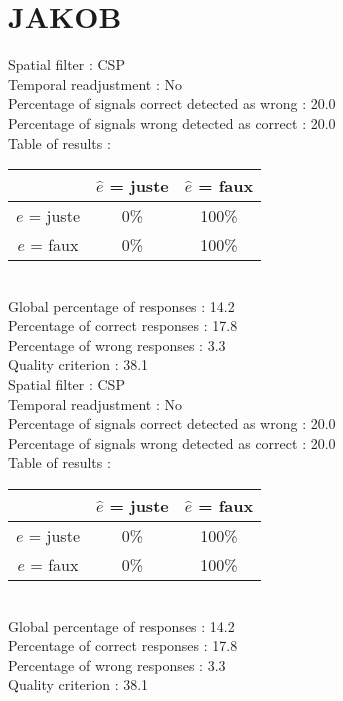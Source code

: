 \section*{JAKOB}
Spatial filter : CSP \\
Temporal readjustment : No \\
Percentage of signals correct detected as wrong :   20.0 \\
Percentage of signals wrong detected as correct :   20.0 \\
Table of results : \\
\begin{tabular}{|c|c|c|}
\hline				& $\hat{e}$ = juste & $\hat{e}$ = faux \\
\hline  $e$ = juste	&      0\%			&    100\%		\\
\hline  $e$ = faux	&      0\%			&    100\%		\\
\hline
\end{tabular}\\
Global percentage of responses :   14.2 \\
Percentage of correct responses :   17.8 \\
Percentage of wrong responses :    3.3 \\
Quality criterion :   38.1 \\

Spatial filter : CSP \\
Temporal readjustment : No \\
Percentage of signals correct detected as wrong :   20.0 \\
Percentage of signals wrong detected as correct :   20.0 \\
Table of results : \\
\begin{tabular}{|c|c|c|}
\hline				& $\hat{e}$ = juste & $\hat{e}$ = faux \\
\hline  $e$ = juste	&      0\%			&    100\%		\\
\hline  $e$ = faux	&      0\%			&    100\%		\\
\hline
\end{tabular}\\
Global percentage of responses :   14.2 \\
Percentage of correct responses :   17.8 \\
Percentage of wrong responses :    3.3 \\
Quality criterion :   38.1 \\

